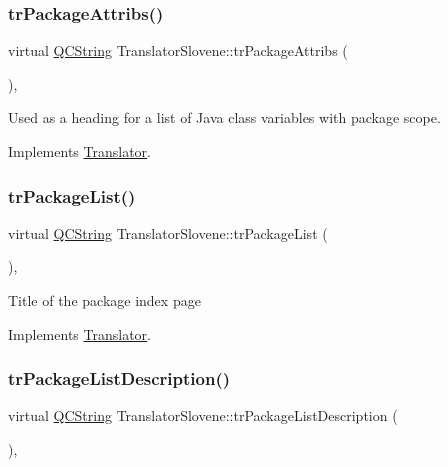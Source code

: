 \subsubsection{\texorpdfstring{trPackageAttribs()}{trPackageAttribs()}}
{\footnotesize\ttfamily virtual \mbox{\hyperlink{class_q_c_string}{Q\+C\+String}} Translator\+Slovene\+::tr\+Package\+Attribs (\begin{DoxyParamCaption}{ }\end{DoxyParamCaption})\hspace{0.3cm}{\ttfamily [inline]}, {\ttfamily [virtual]}}

Used as a heading for a list of Java class variables with package scope. 

Implements \mbox{\hyperlink{class_translator}{Translator}}.

\mbox{\label{class_translator_slovene_a35c9c756ae0608b2995178a613c31d16}} 
\subsubsection{\texorpdfstring{trPackageList()}{trPackageList()}}
{\footnotesize\ttfamily virtual \mbox{\hyperlink{class_q_c_string}{Q\+C\+String}} Translator\+Slovene\+::tr\+Package\+List (\begin{DoxyParamCaption}{ }\end{DoxyParamCaption})\hspace{0.3cm}{\ttfamily [inline]}, {\ttfamily [virtual]}}

Title of the package index page 

Implements \mbox{\hyperlink{class_translator}{Translator}}.

\mbox{\label{class_translator_slovene_ad8ea544349d61167bb4aa472fff5d66f}} 
\subsubsection{\texorpdfstring{trPackageListDescription()}{trPackageListDescription()}}
{\footnotesize\ttfamily virtual \mbox{\hyperlink{class_q_c_string}{Q\+C\+String}} Translator\+Slovene\+::tr\+Package\+List\+Description (\begin{DoxyParamCaption}{ }\end{DoxyParamCaption})\hspace{0.3cm}{\ttfamily [inline]}, {\ttfamily [virtual]}}

